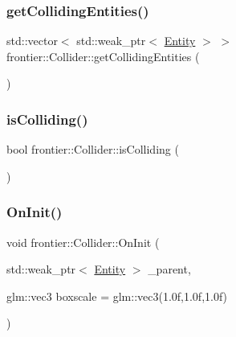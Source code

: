 \subsubsection{\texorpdfstring{get\+Colliding\+Entities()}{getCollidingEntities()}}
{\footnotesize\ttfamily std\+::vector$<$ std\+::weak\+\_\+ptr$<$ \hyperlink{classfrontier_1_1_entity}{Entity} $>$ $>$ frontier\+::\+Collider\+::get\+Colliding\+Entities (\begin{DoxyParamCaption}{ }\end{DoxyParamCaption})}

\mbox{\label{classfrontier_1_1_collider_ad0ad92d0d5a2060284548a990e6aef58}} 
\subsubsection{\texorpdfstring{is\+Colliding()}{isColliding()}}
{\footnotesize\ttfamily bool frontier\+::\+Collider\+::is\+Colliding (\begin{DoxyParamCaption}{ }\end{DoxyParamCaption})}

\mbox{\label{classfrontier_1_1_collider_a111e91b9ed9a336e0a231daeaa6f3490}} 
\subsubsection{\texorpdfstring{On\+Init()}{OnInit()}\hspace{0.1cm}{\footnotesize\ttfamily [1/2]}}
{\footnotesize\ttfamily void frontier\+::\+Collider\+::\+On\+Init (\begin{DoxyParamCaption}\item[{std\+::weak\+\_\+ptr$<$ \hyperlink{classfrontier_1_1_entity}{Entity} $>$}]{\+\_\+parent,  }\item[{glm\+::vec3}]{boxscale = {\ttfamily glm\+:\+:vec3(1.0f,1.0f,1.0f)} }\end{DoxyParamCaption})}

\mbox{\label{classfrontier_1_1_collider_a06dfeb56017f45597f1812fc5cf8236d}} 
